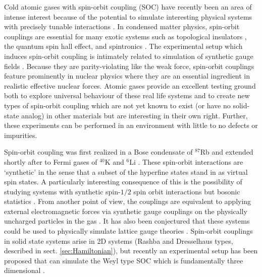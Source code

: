 \documentclass[%
 preprint,
 amsmath,amssymb,
 aps,
]{revtex4-1}
\begin{document}
Cold atomic gases with spin-orbit coupling (SOC) have recently been an area of intense interest because of the potential to simulate interesting physical systems with precisely tunable interactions \cite{nature11841}. In condensed matter physics, spin-orbit couplings are essential for many exotic systems such as topological insulators \cite{das2013engineering,PhysRevLett.105.255302}, the quantum spin hall effect\cite{nature12185}, and spintronics \cite{RevModPhys.76.323}. The experimental setup which induces spin-orbit coupling is intimately related to simulation of synthetic gauge fields \cite{RevModPhys.83.1523,hamner2014dicke,Lin:2009zzb,Bermudez:2011db}. Because they are parity-violating like the weak force, spin-orbit couplings feature prominently in nuclear physics where they are an essential ingredient in realistic effective nuclear forces. Atomic gases provide an excellent testing ground both to explore universal behaviour of these real life systems and to create new types of spin-orbit coupling which are not yet known to exist (or have no solid-state analog) in other materials but are interesting in their own right. Further, these experiments can be performed in an environment with little to no defects or impurities.

Spin-orbit coupling was first realized in a Bose condensate of $^{87}$Rb \cite{nature09887} and extended shortly after to Fermi gases of $^{40}$K \cite{PhysRevLett.109.095301} and $^6$Li \cite{PhysRevLett.109.095302}. These spin-orbit interactions are `synthetic' in the sense that a subset of the hyperfine states stand in as virtual spin states. A particularly interesting consequence of this is the possibility of studying systems with synthetic spin-$1/2$ spin orbit interactions but bosonic statistics \cite{PhysRevA.68.063612,nature09887}. From another point of view, the couplings are equivalent to applying external electromagnetic forces via synthetic gauge couplings on the physically uncharged particles in the gas \cite{Lin:2011,PhysRevLett.107.255301}. It has also been conjectured that these systems could be used to physically simulate lattice gauge theories \cite{Bermudez:2010da,Mazza:2011kf}.  Spin-orbit couplings in solid state systems arise in 2D systems (Rashba and Dresselhaus types, described in sect. \ref{sec:Hamiltonian}), but recently an experimental setup has been proposed that can simulate the Weyl type SOC which is fundamentally three dimensional \cite{PhysRevLett.108.235301}.
\end{document}
